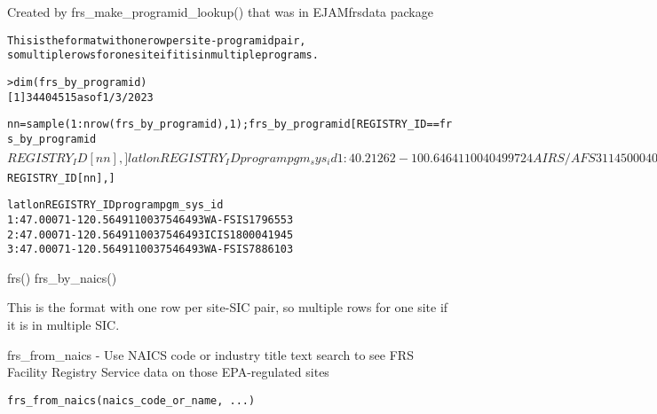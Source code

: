 \documentclass[a4paper]{book}
\begin{document}
\begin{Details}\relax
Created by frs\_make\_programid\_lookup()  that was in EJAMfrsdata package

\begin{alltt}
   This is the format with one row per site-programid pair, 
   so multiple rows for one site if it is in multiple programs.

 > dim(frs_by_programid)
 [1] 3440451       5   as of 1/3/2023

nn=sample(1:nrow(frs_by_programid), 1); frs_by_programid[REGISTRY_ID == frs_by_programid$REGISTRY_ID[nn],]

             lat       lon  REGISTRY_ID  program         pgm_sys_id
     1: 40.21262 -100.6464 110040499724 AIRS/AFS         3114500040
     2: 40.21262 -100.6464 110040499724     NDEQ              87933
     3: 40.21262 -100.6464 110040499724      AIR NE0000003114500040
     
nn=sample(1:nrow(frs_by_programid), 1); frs_by_programid[REGISTRY_ID == frs_by_programid$REGISTRY_ID[nn],]

             lat       lon  REGISTRY_ID program   pgm_sys_id
     1: 47.00071 -120.5649 110037546493 WA-FSIS      1796553
     2: 47.00071 -120.5649 110037546493    ICIS   1800041945
     3: 47.00071 -120.5649 110037546493 WA-FSIS      7886103
  \end{alltt}

\end{Details}
%
\begin{SeeAlso}\relax
frs() frs\_by\_naics()
\end{SeeAlso}
%
\begin{Description}\relax
This is the format with one row per site-SIC pair,
so multiple rows for one site if it is in multiple SIC.
\end{Description}
%
\begin{Description}\relax
frs\_from\_naics - Use NAICS code or industry title text search to see FRS Facility Registry Service data on those EPA-regulated sites
\end{Description}
%
\begin{Usage}
\begin{verbatim}
frs_from_naics(naics_code_or_name, ...)
\end{verbatim}
\end{Usage}
\end{document}
